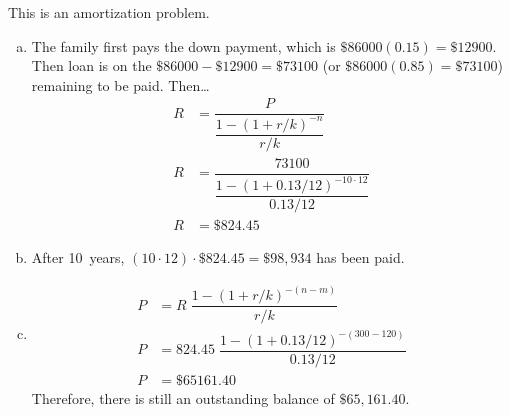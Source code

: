 \documentclass[11pt,letterpaper]{article}
\begin{document}
\sol This is an amortization problem.
\begin{enumerate}[(a)]
\item The family first pays the down payment, which is $\$86000(0.15)= \$12900$. Then loan is on the $\$86000 - \$12900= \$73100$ (or $\$86000(0.85)= \$73100$) remaining to be paid. Then\dots
	\[
	\begin{aligned}
	R&= \dfrac{P}{\dfrac{1 - (1 + r/k)^{-n}}{r/k}} \\
	R&= \dfrac{73100}{\dfrac{1 - (1 + 0.13/12)^{-10 \cdot 12}}{0.13/12}} \\
	R&= \$824.45
	\end{aligned}
	\] \pspace

\item After 10~years, $(10 \cdot 12) \cdot \$824.45= \$98,934$ has been paid. \pspace

\item 
	\[
	\begin{aligned}
	P&= R\; \dfrac{1 - (1 + r/k)^{-(n - m)}}{r/k} \\
	P&= 824.45\; \dfrac{1 - (1 + 0.13/12)^{-(300 - 120)}}{0.13/12} \\
	P&= \$65161.40
	\end{aligned}
	\]
Therefore, there is still an outstanding balance of $\$65,161.40$. 
\end{enumerate}
\end{document}
